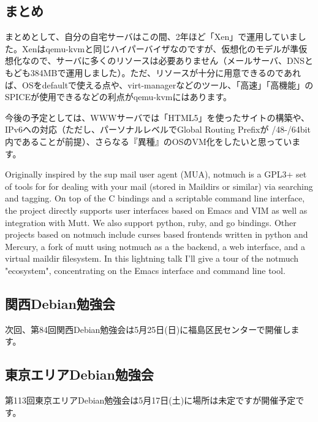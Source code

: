 \documentclass[mingoth,a4paper]{jsarticle}
\begin{document}
\subsection{まとめ}
まとめとして、自分の自宅サーバはこの間、2年ほど「Xen」で運用していました。Xenはqemu-kvmと同じハイパーバイザなのですが、仮想化のモデルが準仮想化なので、サーバに多くのリソースは必要ありません（メールサーバ、DNSともども384MBで運用しました）。ただ、リソースが十分に用意できるのであれば、OSをdefaultで使える点や、virt-managerなどのツール、「高速」「高機能」のSPICEが使用できるなどの利点がqemu-kvmにはあります。

今後の予定としては、WWWサーバでは「HTML5」を使ったサイトの構築や、IPv6への対応（ただし、パーソナルレベルでGlobal Routing Prefixが /48-/64bit内であることが前提）、さらなる『異種』のOSのVM化をしたいと思っています。



Originally inspired by the sup mail user agent (MUA), notmuch is a GPL3+
set of tools for for dealing with your mail (stored in Maildirs or
similar) via searching and tagging. On top of the C bindings and a
scriptable command line interface, the project directly supports user
interfaces based on Emacs and VIM as well as integration with Mutt. We
also support python, ruby, and go bindings. Other projects based on
notmuch include curses based frontends written in python and Mercury, a
fork of mutt using notmuch as a the backend, a web interface, and a
virtual maildir filesystem.  In this lightning talk I'll give a tour of
the notmuch "ecosystem", concentrating on the Emacs interface and
command line tool.




\subsection{関西Debian勉強会}

次回、第84回関西Debian勉強会は5月25日(日)に福島区民センターで開催します。

\subsection{東京エリアDebian勉強会}
第113回東京エリアDebian勉強会は5月17日(土)に場所は未定ですが開催予定です。

%
\mbox{}\newpage
\end{document}
